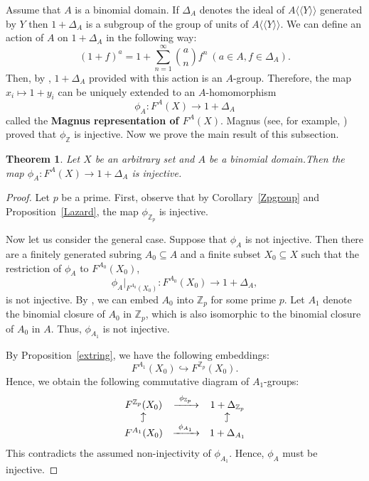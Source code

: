 \documentclass[11pt]{amsart}
\newtheorem{teo}[lem]{Theorem}
\numberwithin{claimcounter}{lem}
\newcommand{\hookuparrow}{\mathrel{\rotatebox[origin=c]{90}{$\hookrightarrow$}}}
\newcommand{\Z}{\mathbb{Z}}
\begin{document}
Assume that $A$ is a binomial domain. If $\Delta_A$  denotes the ideal of $A\langle \! \langle  Y\rangle \! \rangle $ generated by $Y$ then $1+\Delta_A$ is a subgroup
of the group of units of $A\langle \! \langle  Y\rangle \! \rangle $. We can define an action of $A$ on $1+\Delta_A$  in the following way:
$$(1+f)^a=1+\sum_{n=1}^\infty {a \choose n} f^n\ (a\in A, f\in \Delta_A).$$
Then, by \cite{Wa76}, $1+\Delta_A$ provided with this action is an $A$-group. Therefore, the map $x_i\mapsto 1+y_i$ can be uniquely extended to an $A$-homomorphism 
$$\phi_A: F^A(X)\to 1+\Delta_A$$ called  the {\bf Magnus representation of $F^A(X)$}. Magnus (see, for example, \cite{MKS}) proved that $\phi_\Z$ is injective.  Now we prove the  main result of this subsection.
\begin{teo}\label{MagnusA} Let $X$ be an arbitrary set and  $A$ be a binomial domain.Then 
the map $\phi_{A}: F^{A}(X)\to 1+\Delta_{A}$ is injective.
\end{teo}

\begin{proof}
Let $p$ be a prime. First, observe that by Corollary~\ref{Zpgroup} and Proposition~\ref{Lazard}, the map $\phi_{\mathbb{Z}_p}$ is injective.

Now let us consider the general case. Suppose that $\phi_A$ is not injective. Then there are a finitely generated subring $A_0 \subseteq A$ and a finite subset $X_0 \subseteq X$ such that the restriction of $\phi_A$ to $F^{A_0}(X_0)$,
\[
\phi_A|_{F^{A_0}(X_0)} \colon F^{A_0}(X_0) \to 1 + \Delta_A,
\]
is not injective.  
By \cite{Ca76}, we can embed $A_0$ into $\mathbb{Z}_p$ for some prime $p$. Let $A_1$ denote the binomial closure of $A_0$ in $\mathbb{Z}_p$, which is also isomorphic to the binomial closure of $A_0$ in $A$. Thus, $\phi_{A_1}$ is not injective.

By Proposition~\ref{extring}, we have the following embeddings:
\[
F^{A_1}(X_0) \hookrightarrow F^{\mathbb{Z}_p}(X_0).
\]
Hence, we obtain the following commutative diagram of $A_1$-groups:
\[
\begin{array}{ccc}
  F^{\mathbb{Z}_p}(X_0) & \xrightarrow{\ \phi_{\mathbb{Z}_p}\ } & 1 + \Delta_{\mathbb{Z}_p} \\
  \hookuparrow & & \hookuparrow \\
 F^{A_1}(X_0) & \xrightarrow{\ \phi_{A_1}\ } & 1 + \Delta_{A_1}
\end{array}
\]
This contradicts the assumed non-injectivity of $\phi_{A_1}$. Hence, $\phi_A$ must be injective.
\end{proof}
\end{document}
